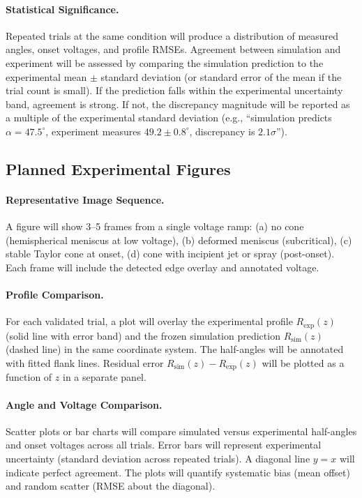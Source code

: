 \paragraph{Statistical Significance.} Repeated trials at the same condition will produce a distribution of measured angles, onset voltages, and profile RMSEs. Agreement between simulation and experiment will be assessed by comparing the simulation prediction to the experimental mean $\pm$ standard deviation (or standard error of the mean if the trial count is small). If the prediction falls within the experimental uncertainty band, agreement is strong. If not, the discrepancy magnitude will be reported as a multiple of the experimental standard deviation (e.g., ``simulation predicts $\alpha = 47.5^{\circ}$, experiment measures $49.2 \pm 0.8^{\circ}$, discrepancy is $2.1 \sigma$'').

\subsection{Planned Experimental Figures}

\paragraph{Representative Image Sequence.} A figure will show 3--5 frames from a single voltage ramp: (a) no cone (hemispherical meniscus at low voltage), (b) deformed meniscus (subcritical), (c) stable Taylor cone at onset, (d) cone with incipient jet or spray (post-onset). Each frame will include the detected edge overlay and annotated voltage.

\paragraph{Profile Comparison.} For each validated trial, a plot will overlay the experimental profile $R_{\mathrm{exp}}(z)$ (solid line with error band) and the frozen simulation prediction $R_{\mathrm{sim}}(z)$ (dashed line) in the same coordinate system. The half-angles will be annotated with fitted flank lines. Residual error $R_{\mathrm{sim}}(z) - R_{\mathrm{exp}}(z)$ will be plotted as a function of $z$ in a separate panel.

\paragraph{Angle and Voltage Comparison.} Scatter plots or bar charts will compare simulated versus experimental half-angles and onset voltages across all trials. Error bars will represent experimental uncertainty (standard deviation across repeated trials). A diagonal line $y = x$ will indicate perfect agreement. The plots will quantify systematic bias (mean offset) and random scatter (RMSE about the diagonal).

